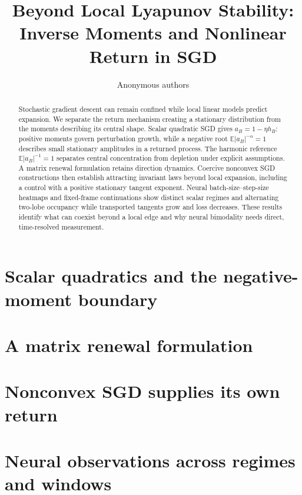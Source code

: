 \documentclass{article}
\title{Beyond Local Lyapunov Stability:\\Inverse Moments and Nonlinear Return in SGD}
\author{Anonymous authors}
\theoremstyle{definition}
\begin{document}
\maketitle
\begin{abstract}
Stochastic gradient descent can remain confined while local linear models predict expansion. We separate the return mechanism creating a stationary distribution from the moments describing its central shape. Scalar quadratic SGD gives $a_B=1-\eta h_B$: positive moments govern perturbation growth, while a negative root $\mathbb E|a_B|^{-\alpha}=1$ describes small stationary amplitudes in a returned process. The harmonic reference $\mathbb E|a_B|^{-1}=1$ separates central concentration from depletion under explicit assumptions. A matrix renewal formulation retains direction dynamics. Coercive nonconvex SGD constructions then establish attracting invariant laws beyond local expansion, including a control with a positive stationary tangent exponent. Neural batch-size--step-size heatmaps and fixed-frame continuations show distinct scalar regimes and alternating two-lobe occupancy while transported tangents grow and loss decreases. These results identify what can coexist beyond a local edge and why neural bimodality needs direct, time-resolved measurement.
\end{abstract}

\section{Scalar quadratics and the negative-moment boundary}


\section{A matrix renewal formulation}

\section{Nonconvex SGD supplies its own return}



\section{Neural observations across regimes and windows}

\clearpage

\label{main:lastpage}
\clearpage


\clearpage
\appendix




\end{document}
